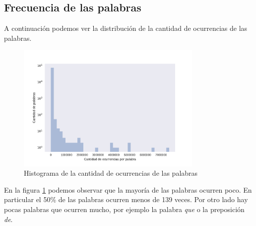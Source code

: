 \subsection{Frecuencia de las palabras}
\label{sub: frecuenciaPalabras}
A continuación podemos ver la distribución de la cantidad de ocurrencias de las palabras.
\begin{figure}[ht]
\centering
\includegraphics[width=0.8\textwidth]{./images/DistribucionOcurrenciasPalabras.pdf} 
\caption{Histograma de la cantidad de ocurrencias de las palabras} 
\label{fig:cantPalabras} 
\end{figure}

En la figura \ref{fig:cantPalabras} podemos observar que la mayoría de las palabras ocurren poco. En particular el 50\% de las palabras ocurren menos de 139 veces. Por otro lado hay pocas palabras que ocurren mucho, por ejemplo la palabra \textit{que} o la preposición \textit{de}.

